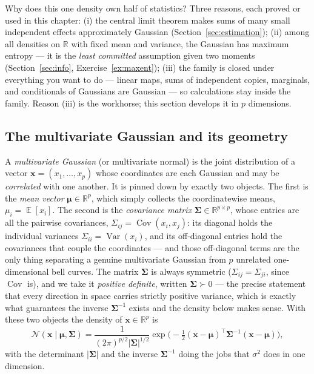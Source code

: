 \documentclass[11pt]{article}
\numberwithin{equation}{section}
\theoremstyle{plain}
\theoremstyle{definition}
\theoremstyle{remark}
\DeclareMathOperator{\E}{\mathbb{E}}
\DeclareMathOperator{\Var}{Var}
\DeclareMathOperator{\Cov}{Cov}
\newcommand{\Normal}{\mathcal{N}}
\newcommand{\R}{\mathbb{R}}
\newcommand{\x}{\bm{x}}
\newcommand{\bmu}{\bm{\mu}}
\newcommand{\bSigma}{\bm{\Sigma}}
\newcommand{\T}{\top}
\begin{document}
Why does this one density own half of statistics? Three reasons, each proved or used in this chapter: (i) the central limit theorem makes sums of many small independent effects approximately Gaussian (Section~\ref{sec:estimation}); (ii) among all densities on $\R$ with fixed mean and variance, the Gaussian has maximum entropy --- it is the \emph{least committed} assumption given two moments (Section~\ref{sec:info}, Exercise~\ref{ex:maxent}); (iii) the family is closed under everything you want to do --- linear maps, sums of independent copies, marginals, and conditionals of Gaussians are Gaussian --- so calculations stay inside the family. Reason (iii) is the workhorse; this section develops it in $p$ dimensions.

\subsection{The multivariate Gaussian and its geometry}

A \emph{multivariate Gaussian} (or multivariate normal) is the joint distribution of a vector $\x = (x_1, \dots, x_p)$ whose coordinates are each Gaussian and may be \emph{correlated} with one another. It is pinned down by exactly two objects. The first is the \emph{mean vector} $\bmu \in \R^p$, which simply collects the coordinatewise means, $\mu_i = \E[x_i]$. The second is the \emph{covariance matrix} $\bSigma \in \R^{p \times p}$, whose entries are all the pairwise covariances, $\Sigma_{ij} = \Cov(x_i, x_j)$: its diagonal holds the individual variances $\Sigma_{ii} = \Var(x_i)$, and its off-diagonal entries hold the covariances that couple the coordinates --- and those off-diagonal terms are the only thing separating a genuine multivariate Gaussian from $p$ unrelated one-dimensional bell curves. The matrix $\bSigma$ is always symmetric ($\Sigma_{ij} = \Sigma_{ji}$, since $\Cov$ is), and we take it \emph{positive definite}, written $\bSigma \succ 0$ --- the precise statement that every direction in space carries strictly positive variance, which is exactly what guarantees the inverse $\bSigma^{-1}$ exists and the density below makes sense. With these two objects the density of $\x \in \R^p$ is
\begin{equation}
\Normal(\x \mid \bmu, \bSigma)
= \frac{1}{(2\pi)^{p/2} |\bSigma|^{1/2}}
\exp\!\Big(\!-\tfrac12 (\x - \bmu)^\T \bSigma^{-1} (\x - \bmu)\Big),
\label{eq:mvn}
\end{equation}
with the determinant $|\bSigma|$ and the inverse $\bSigma^{-1}$ doing the jobs that $\sigma^2$ does in one dimension.
\end{document}
